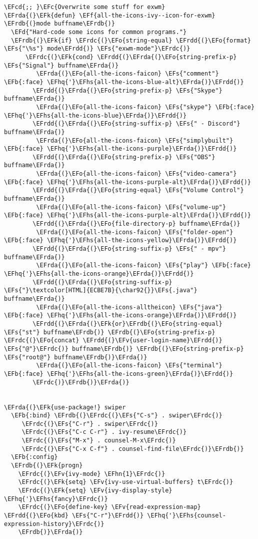 \documentclass[a4wide,10pt]{article}
\newcommand{\EFc}[1]{\textcolor{EFc}{#1}} %
\newcommand{\EFcd}[1]{\textcolor{EFcd}{#1}} %
\newcommand{\EFs}[1]{\textcolor{EFs}{#1}} %
\newcommand{\EFd}[1]{\textcolor{EFd}{#1}} %
\newcommand{\EFk}[1]{\textcolor{EFk}{#1}} %
\newcommand{\EFb}[1]{\textcolor{EFb}{#1}} %
\newcommand{\EFf}[1]{\textcolor{EFf}{#1}} %
\newcommand{\EFv}[1]{\textcolor{EFv}{#1}} %
\newcommand{\EFo}[1]{\textcolor{EFo}{#1}} %
\newcommand{\EFhn}[1]{\textcolor{EFhn}{\textbf{#1}}} %
\newcommand{\EFhq}[1]{\textcolor{EFhq}{#1}} %
\newcommand{\EFhs}[1]{\textcolor{EFhs}{#1}} %
\newcommand{\EFrda}[1]{\textcolor{EFrda}{#1}} %
\newcommand{\EFrdb}[1]{\textcolor{EFrdb}{#1}} %
\newcommand{\EFrdc}[1]{\textcolor{EFrdc}{#1}} %
\newcommand{\EFrdd}[1]{\textcolor{EFrdd}{#1}} %
\begin{document}
\begin{Code}
\begin{Verbatim}
\EFcd{;; }\EFc{Overwrite some stuff for exwm}
\EFrda{(}\EFk{defun} \EFf{all-the-icons-ivy--icon-for-exwm} \EFrdb{(}mode buffname\EFrdb{)}
  \EFd{"Hard-code some icons for common programs."}
  \EFrdb{(}\EFk{if} \EFrdc{(}\EFo{string-equal} \EFrdd{(}\EFo{format} \EFs{"\%s"} mode\EFrdd{)} \EFs{"exwm-mode"}\EFrdc{)}
      \EFrdc{(}\EFk{cond} \EFrdd{(}\EFrda{(}\EFo{string-prefix-p} \EFs{"Signal"} buffname\EFrda{)}
	     \EFrda{(}\EFo{all-the-icons-faicon} \EFs{"comment"} \EFb{:face} \EFhq{'}\EFhs{all-the-icons-blue-alt}\EFrda{)}\EFrdd{)}
	    \EFrdd{(}\EFrda{(}\EFo{string-prefix-p} \EFs{"Skype"} buffname\EFrda{)}
	     \EFrda{(}\EFo{all-the-icons-faicon} \EFs{"skype"} \EFb{:face} \EFhq{'}\EFhs{all-the-icons-blue}\EFrda{)}\EFrdd{)}
	    \EFrdd{(}\EFrda{(}\EFo{string-suffix-p} \EFs{" - Discord"} buffname\EFrda{)}
	     \EFrda{(}\EFo{all-the-icons-faicon} \EFs{"simplybuilt"} \EFb{:face} \EFhq{'}\EFhs{all-the-icons-purple}\EFrda{)}\EFrdd{)}
	    \EFrdd{(}\EFrda{(}\EFo{string-prefix-p} \EFs{"OBS"} buffname\EFrda{)}
	     \EFrda{(}\EFo{all-the-icons-faicon} \EFs{"video-camera"} \EFb{:face} \EFhq{'}\EFhs{all-the-icons-purple-alt}\EFrda{)}\EFrdd{)}
	    \EFrdd{(}\EFrda{(}\EFo{string-equal} \EFs{"Volume Control"} buffname\EFrda{)}
	     \EFrda{(}\EFo{all-the-icons-faicon} \EFs{"volume-up"} \EFb{:face} \EFhq{'}\EFhs{all-the-icons-purple-alt}\EFrda{)}\EFrdd{)}
	    \EFrdd{(}\EFrda{(}\EFo{file-directory-p} buffname\EFrda{)}
	     \EFrda{(}\EFo{all-the-icons-faicon} \EFs{"folder-open"} \EFb{:face} \EFhq{'}\EFhs{all-the-icons-yellow}\EFrda{)}\EFrdd{)}
	    \EFrdd{(}\EFrda{(}\EFo{string-suffix-p} \EFs{" - mpv"} buffname\EFrda{)}
	     \EFrda{(}\EFo{all-the-icons-faicon} \EFs{"play"} \EFb{:face} \EFhq{'}\EFhs{all-the-icons-orange}\EFrda{)}\EFrdd{)}
	    \EFrdd{(}\EFrda{(}\EFo{string-suffix-p} \EFs{"}\textcolor[HTML]{ECBE7B}{\char92{}}\EFs{.java"} buffname\EFrda{)}
	     \EFrda{(}\EFo{all-the-icons-alltheicon} \EFs{"java"} \EFb{:face} \EFhq{'}\EFhs{all-the-icons-orange}\EFrda{)}\EFrdd{)}
	    \EFrdd{(}\EFrda{(}\EFk{or}\EFrdb{(}\EFo{string-equal} \EFs{"st"} buffname\EFrdb{)} \EFrdb{(}\EFo{string-prefix-p} \EFrdc{(}\EFo{concat} \EFrdd{(}\EFv{user-login-name}\EFrdd{)} \EFs{"@"}\EFrdc{)} buffname\EFrdb{)} \EFrdb{(}\EFo{string-prefix-p} \EFs{"root@"} buffname\EFrdb{)}\EFrda{)}
	     \EFrda{(}\EFo{all-the-icons-faicon} \EFs{"terminal"} \EFb{:face} \EFhq{'}\EFhs{all-the-icons-green}\EFrda{)}\EFrdd{)}
	    \EFrdc{)}\EFrdb{)}\EFrda{)}


\EFrda{(}\EFk{use-package!} swiper
  \EFb{:bind} \EFrdb{(}\EFrdc{(}\EFs{"C-s"} . swiper\EFrdc{)}
	 \EFrdc{(}\EFs{"C-r"} . swiper\EFrdc{)}
	 \EFrdc{(}\EFs{"C-c C-r"} . ivy-resume\EFrdc{)}
	 \EFrdc{(}\EFs{"M-x"} . counsel-M-x\EFrdc{)}
	 \EFrdc{(}\EFs{"C-x C-f"} . counsel-find-file\EFrdc{)}\EFrdb{)}
  \EFb{:config}
  \EFrdb{(}\EFk{progn}
    \EFrdc{(}\EFv{ivy-mode} \EFhn{1}\EFrdc{)}
    \EFrdc{(}\EFk{setq} \EFv{ivy-use-virtual-buffers} t\EFrdc{)}
    \EFrdc{(}\EFk{setq} \EFv{ivy-display-style} \EFhq{'}\EFhs{fancy}\EFrdc{)}
    \EFrdc{(}\EFo{define-key} \EFv{read-expression-map} \EFrdd{(}\EFo{kbd} \EFs{"C-r"}\EFrdd{)} \EFhq{'}\EFhs{counsel-expression-history}\EFrdc{)}
    \EFrdb{)}\EFrda{)}


\end{Verbatim}
\end{Code}
\end{document}
